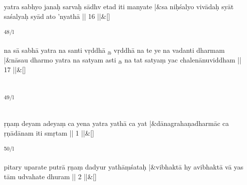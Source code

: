 \documentclass[article,12pt,a4paper]{memoir}%
\begin{document}
	    
	    \stanza[\smallbreak]
	  yatra sabhyo janaḥ sarvaḥ sādhv etad iti manyate |&sa niḥśalyo vivādaḥ syāt saśalyaḥ syād ato 'nyathā || 16 ||\&[\smallbreak]
	  
	  
	  \textsuperscript{\textenglish{48/l}}
	    
	    \stanza[\smallbreak]
	  na sā sabhā yatra na santi vṛddhā {\tiny $_{lb}$} vṛddhā na te ye na vadanti dharmam |&nāsau dharmo yatra na satyam asti {\tiny $_{lb}$} na tat satyaṃ yac chalenānuviddham || 17 ||\&[\smallbreak]
	  
	  
	  
	    
	    \endnumbering%
	    
	  
	  
	
	    
	    \beginnumbering%
	    
	  
\part{{}}\textsuperscript{\textenglish{49/l}}
	  
	
\chapter[{Chapter 1: Ṛṇādānam (Nonpayment of Debts)}][{Chapter 1: Ṛṇādānam (Nonpayment of Debts)}]{{}}
	    
	    \stanza[\smallbreak]
	  ṛṇaṃ deyam adeyaṃ ca yena yatra yathā ca yat |&dānagrahaṇadharmāc ca ṛṇādānam iti smṛtam || 1 ||\&[\smallbreak]
	  
	  
	  \textsuperscript{\textenglish{50/l}}
	    
	    \stanza[\smallbreak]
	  pitary uparate putrā ṛṇaṃ dadyur yathāṃśataḥ |&vibhaktā hy avibhaktā vā yas tām udvahate dhuram || 2 ||\&[\smallbreak]
	  
\end{document}
